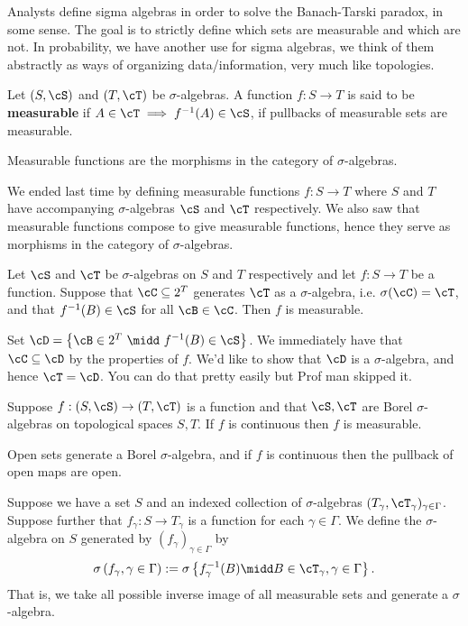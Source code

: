 Analysts define sigma algebras in order to solve the Banach-Tarski paradox, in some sense. The goal is to strictly define which sets are measurable and which are not. In probability, we have another use for sigma algebras, we think of them abstractly as ways of organizing data/information, very much like topologies.

\begin{defn}\label{defn:measurable-function}
  Let $(S,\cS)$ and $(T,\cT)$ be $\sigma$-algebras. A function $f:S\to T$ is said to be \textbf{measurable} if $A \in \cT \implies f^{-1}(A) \in \cS$, if pullbacks of measurable sets are measurable.
\end{defn}
Measurable functions are the morphisms in the category of $\sigma$-algebras.


We ended last time by defining measurable functions $f:S\to T$ where $S$ and $T$ have accompanying $\sigma$-algebras $\cS$ and $\cT$ respectively. We also saw that measurable functions compose to give measurable functions, hence they serve as morphisms in the category of $\sigma$-algebras.

\begin{prop}\label{prop:measurability-criterion}
  Let $\cS$ and $\cT$ be $\sigma$-algebras on $S$ and $T$ respectively and let $f:S\to T$ be a function. Suppose that $\cC\subseteq 2^T$ generates $\cT$ as a $\sigma$-algebra, i.e. $\sigma(\cC) = \cT$, and that $f^{-1}(B) \in \cS$ for all $\cB \in \cC$. Then $f$ is measurable.
\end{prop}
\begin{prf}
  Set $\cD = \left\{\cB \in 2^T ~\midd~ f^{-1}(B) \in \cS\right\}$. We immediately have that $\cC\subseteq \cD$ by the properties of $f$. We'd like to show that $\cD$ is a $\sigma$-algebra, and hence $\cT = \cD$. You can do that pretty easily but Prof man skipped it.
\end{prf}

\begin{cor}\label{cor:continuous-implies-measurable}
  Suppose $f:(S,\cS) \to (T,\cT)$ is a function and that $\cS,\cT$ are Borel $\sigma$-algebras on topological spaces $S,T$. If $f$ is continuous then $f$ is measurable.
\end{cor}
\begin{prf}
  Open sets generate a Borel $\sigma$-algebra, and if $f$ is continuous then the pullback of open maps are open.
\end{prf}

\begin{defn}\label{defn:}
  Suppose we have a set $S$ and an indexed collection of $\sigma$-algebras $(T_\gamma, \cT_\gamma)_{\gamma \in \Gamma}$. Suppose further that $f_\gamma:S\to T_\gamma$ is a function for each $\gamma \in \Gamma$. We define the $\sigma$-algebra on $S$ generated by $(f_\gamma)_{\gamma \in \Gamma}$ by
  \begin{align*}
    \sigma\left(f_\gamma, \gamma \in \Gamma\right) := \sigma\left\{f^{-1}_\gamma(B) \midd B \in \cT_\gamma, \gamma \in \Gamma\right\}.
  \end{align*}
  That is, we take all possible inverse image of all measurable sets and generate a $\sigma$-algebra.
\end{defn}

